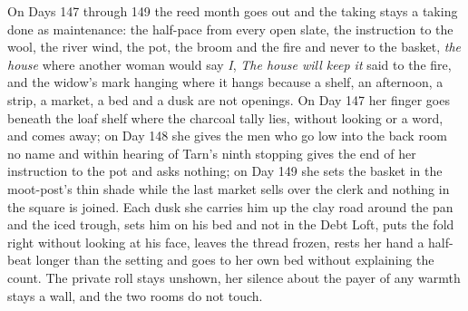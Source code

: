 \documentclass{design/chronicle}
\begin{document}
{On Days 147 through 149 the reed month goes out and the taking stays a taking done as maintenance: the half-pace from every open slate, the instruction to the wool, the river wind, the pot, the broom and the fire and never to the basket, \emph{the house} where another woman would say \emph{I}, \emph{The house will keep it} said to the fire, and the widow’s mark hanging where it hangs because a shelf, an afternoon, a strip, a market, a bed and a dusk are not openings. On Day 147 her finger goes beneath the loaf shelf where the charcoal tally lies, without looking or a word, and comes away; on Day 148 she gives the men who go low into the back room no name and within hearing of Tarn’s ninth stopping gives the end of her instruction to the pot and asks nothing; on Day 149 she sets the basket in the moot-post’s thin shade while the last market sells over the clerk and nothing in the square is joined. Each dusk she carries him up the clay road around the pan and the iced trough, sets him on his bed and not in the Debt Loft, puts the fold right without looking at his face, leaves the thread frozen, rests her hand a half-beat longer than the setting and goes to her own bed without explaining the count. The private roll stays unshown, her silence about the payer of any warmth stays a wall, and the two rooms do not touch.

}
\end{document}
